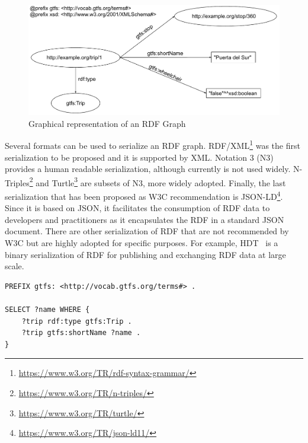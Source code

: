 \begin{figure}[!ht]
\centering
\includegraphics[width=\textwidth]{figures/state-of-the-art/RDF.pdf}
\caption{Graphical representation of an RDF Graph}
\label{fig:soa_rdf_example}
\end{figure}


Several formats can be used to serialize an RDF graph. RDF/XML\footnote{\url{https://www.w3.org/TR/rdf-syntax-grammar/}} was the first serialization to be proposed and it is supported by XML. Notation 3 (N3) provides a human readable serialization, although currently is not used widely. N-Triples\footnote{\url{https://www.w3.org/TR/n-triples/}} and Turtle\footnote{\url{https://www.w3.org/TR/turtle/}} are subsets of N3, more widely adopted. Finally, the last serialization that has been proposed as W3C recommendation is JSON-LD\footnote{\url{https://www.w3.org/TR/json-ld11/}}. Since it is based on JSON, it facilitates the consumption of RDF data to developers and practitioners as it encapsulates the RDF in a standard JSON document. There are other serialization of RDF that are not recommended by W3C but are highly adopted for specific purposes. For example, HDT~\citep{fernandez2013binary} is a binary serialization of RDF for publishing and exchanging RDF data at large scale.

\begin{lstlisting}[float,caption=Example of SPARQL query,frame=tlrb,label={list:soa_sparql_example}, columns=fullflexible]
PREFIX gtfs: <http://vocab.gtfs.org/terms#> .

SELECT ?name WHERE {
    ?trip rdf:type gtfs:Trip .
    ?trip gtfs:shortName ?name .
}
\end{lstlisting}
